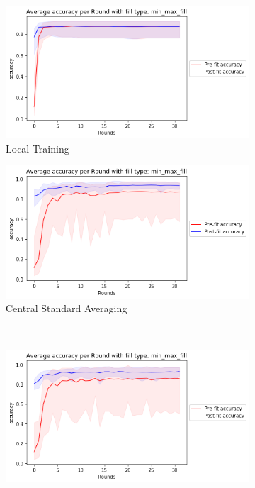 \documentclass[12pt]{article}
\begin{document}
\begin{figure}[H]
\begin{subfigure}{0.45\textwidth}
\end{subfigure}%
\\
\begin{subfigure}{0.45\textwidth}
    \includegraphics[width=\textwidth]{resources/posture_localround-0.7-accuracy.png}
    \raggedleft
    \caption{\small Local Training}
\end{subfigure}
\begin{subfigure}{0.45\textwidth}
    \raggedleft
    \includegraphics[width=\textwidth]{resources/posture_centralround-0.7-accuracy.png}
    \caption{\small Central Standard Averaging}
\end{subfigure}%
\\
\begin{subfigure}{0.45\textwidth}
    \raggedleft
    \includegraphics[width=\textwidth]{resources/posture_stdround-0.7-accuracy.png}

\end{subfigure}
\end{figure}
\end{document}
